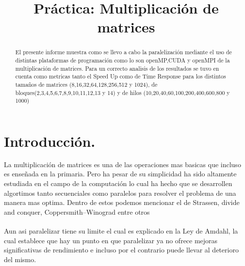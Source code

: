 \documentclass{IEEEtran}
\begin{document}
%
\title{Práctica: Multiplicación de matrices}


\author{
}


\maketitle

\nonstopmode

\tableofcontents 
\hfill


\begin{abstract}
El presente informe muestra como se llevo a cabo la paralelización  mediante el uso de distintas plataformas de programación como lo son openMP,CUDA  y openMPI de la multiplicación de matrices.
Para un correcto analisis de los resultados se tuvo en cuenta como metricas tanto el Speed Up como de Time Response 
para los distintos  tamaños de matrices (8,16,32,64,128,256,512 y 1024), de bloques(2,3,4,5,6,7,8,9,10,11,12,13 y 14) y de hilos (10,20,40,60,100,200,400,600,800 y 1000)

\end{abstract}



\IEEEpeerreviewmaketitle



\section{Introducción.}
La multiplicación de matrices es una  de las operaciones  mas basicas que incluso es enseñada en la primaria.
 Pero ha pesar de  su    simplicidad ha sido altamente estudiada en  el campo  de la computación  lo   cual
 ha   hecho que se  desarrollen   algortimos tanto secuenciales como  paralelos para resolver  el problema de 
 una manera  mas optima.  Dentro de estos podemos mencionar el de  Strassen, divide  and conquer, Coppersmith–Winograd entre otros\\\\
Aun asi paralelizar tiene su limite el cual es explicado en la Ley de Amdahl, la cual establece que hay un punto en que paralelizar ya no ofrece mejoras significativas de rendimiento e incluso por el contrario puede llevar al deterioro del mismo.\\\\
\end{document}
